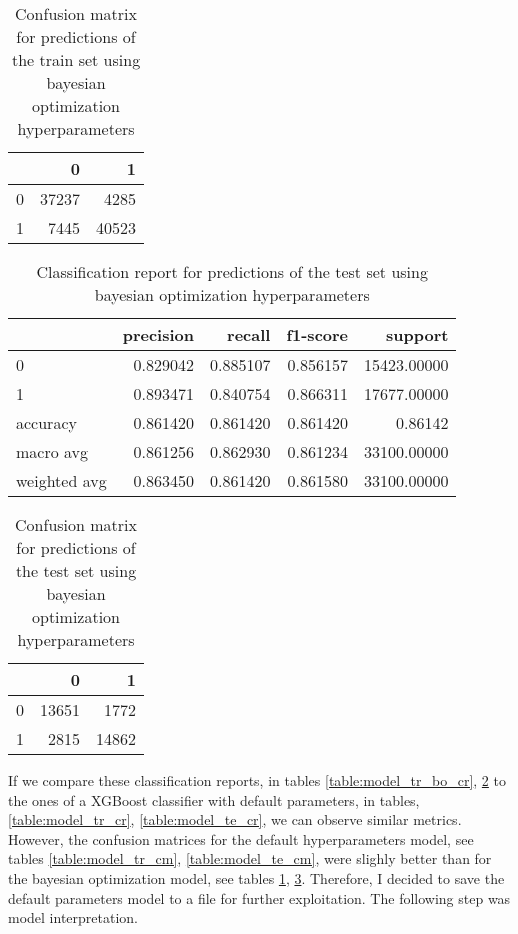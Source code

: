 \documentclass{article}
\begin{document}
\begin{itemize}
\begin{table}[h!]
\begin{tabular}{lrr}
\toprule
{} &      0 &      1 \\
\midrule
0 &  37237 &   4285 \\
1 &   7445 &  40523 \\
\bottomrule
\end{tabular}
\caption{Confusion matrix for predictions of the train set using bayesian optimization hyperparameters}
\label{table:model_tr_bo_cm}
\end{table}

\begin{table}[h!]
\centering
\begin{tabular}{lrrrr}
\toprule
{} &  precision &    recall &  f1-score &      support \\
\midrule
0            &   0.829042 &  0.885107 &  0.856157 &  15423.00000 \\
1            &   0.893471 &  0.840754 &  0.866311 &  17677.00000 \\
accuracy     &   0.861420 &  0.861420 &  0.861420 &      0.86142 \\
macro avg    &   0.861256 &  0.862930 &  0.861234 &  33100.00000 \\
weighted avg &   0.863450 &  0.861420 &  0.861580 &  33100.00000 \\
\bottomrule
\end{tabular}
\caption{Classification report for predictions of the test set using bayesian optimization hyperparameters}
\label{table:model_te_bo_cr}
\end{table}
 
\begin{table}[h!]
\centering
\begin{tabular}{lrr}
\toprule
{} &      0 &      1 \\
\midrule
0 &  13651 &   1772 \\
1 &   2815 &  14862 \\
\bottomrule
\end{tabular}
\caption{Confusion matrix for predictions of the test set using bayesian optimization hyperparameters}
\label{table:model_te_bo_cm}
\end{table}

If we compare these classification reports, in tables \ref{table:model_tr_bo_cr}, \ref{table:model_te_bo_cr} to the ones of a XGBoost classifier with default parameters, in tables, \ref{table:model_tr_cr}, \ref{table:model_te_cr}, we can observe similar metrics. However, the confusion matrices for the default hyperparameters model, see tables \ref{table:model_tr_cm}, \ref{table:model_te_cm}, were slighly better than for the bayesian optimization model, see tables \ref{table:model_tr_bo_cm}, \ref{table:model_te_bo_cm}. Therefore, I decided to save the default parameters model to a file for further exploitation.  The following step was model interpretation.


\end{itemize}
\end{document}
